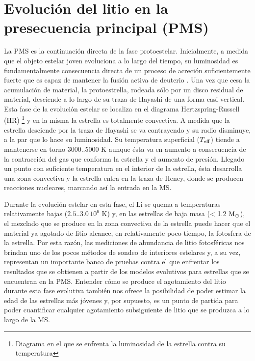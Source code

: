 \section{Evolución del litio en la presecuencia principal (PMS)}
La PMS es la continuación directa de la fase protoestelar. Inicialmente, a medida que el objeto estelar joven evoluciona a lo largo del tiempo, su luminosidad es fundamentalmente consecuencia directa de un proceso de acreción suficientemente fuerte que es capaz de mantener la fusión activa de deuterio \citep{Stahler1983}. Una vez que cesa la acumulación de material, la protoestrella, rodeada sólo por un disco residual de material, desciende a lo largo de su traza de Hayashi de una forma casi vertical. Esta fase de la evolución estelar se localiza en el diagrama Hertzspring-Russell (HR) \footnote{Diagrama en el que se enfrenta la luminosidad de la estrella contra su temperatura} y en la misma la estrella es totalmente convectiva. A medida que la estrella desciende por la traza de Hayashi se va contrayendo y su radio disminuye, a la par que lo hace su luminosidad. Su temperatura superficial ($T_{\mathrm{eff}}$) tiende a mantenerse  en torno $3000..5000$ K aunque ésta va en aumento a consecuencia de la contracción del gas que conforma la estrella y el aumento de presión. Llegado un punto con suficiente temperatura en el interior de la estrella, ésta desarrolla una zona convectiva y la estrella entra en la traza de Heney, donde se producen reacciones nucleares, marcando así la entrada en la MS. \par

Durante la evolución estelar en esta fase, el Li se quema a temperaturas relativamente bajas ($2.5..3.0 \, 10^{6}$ K) y, en las estrellas de baja masa (< 1.2 $\mathrm{M}_\odot$), el mezclado que se produce en la zona convectiva de la estrella puede hacer que el material ya agotado de litio alcance, en relativamente poco tiempo, la fotosfera de la estrella. Por esta razón, las mediciones de abundancia de litio fotosféricas nos brindan uno de los pocos métodos de sondeo de interiores estelares y, a su vez, representan un importante banco de pruebas contra el que enfrentar los resultados que se obtienen a partir de los modelos evolutivos para estrellas que se encuentran en la PMS. Entender cómo se produce el agotamiento del litio durante esta fase evolutiva también nos ofrece la posibilidad de poder estimar la edad de las estrellas más jóvenes y, por supuesto, es un punto de partida para poder cuantificar cualquier agotamiento subsiguiente de litio que se produzca a lo largo de la MS.\par

